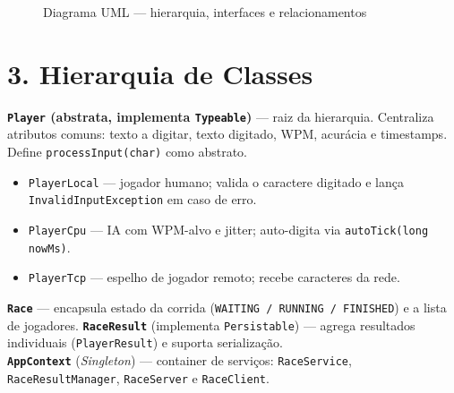 \documentclass[11pt,a4paper]{article}
\begin{document}
\begin{figure}[H]
\caption{Diagrama UML — hierarquia, interfaces e relacionamentos}
\end{figure}

\section*{3. Hierarquia de Classes}

\textbf{\texttt{Player} (abstrata, implementa \texttt{Typeable})} — raiz da hierarquia. Centraliza atributos comuns: texto a digitar, texto digitado, WPM, acurácia e timestamps. Define \texttt{processInput(char)} como abstrato.

\begin{itemize}[leftmargin=*, itemsep=1pt, topsep=2pt]
    \item \texttt{PlayerLocal} — jogador humano; valida o caractere digitado e lança \texttt{InvalidInputException} em caso de erro.
    \item \texttt{PlayerCpu} — IA com WPM-alvo e jitter; auto-digita via \texttt{autoTick(long nowMs)}.
    \item \texttt{PlayerTcp} — espelho de jogador remoto; recebe caracteres da rede.
\end{itemize}

\textbf{\texttt{Race}} — encapsula estado da corrida (\texttt{WAITING / RUNNING / FINISHED}) e a lista de jogadores.
\textbf{\texttt{RaceResult}} (implementa \texttt{Persistable}) — agrega resultados individuais (\texttt{PlayerResult}) e suporta serialização.\\
\textbf{\texttt{AppContext}} (\emph{Singleton}) — container de serviços: \texttt{RaceService}, \texttt{RaceResultManager}, \texttt{RaceServer} e \texttt{RaceClient}.

\end{document}
